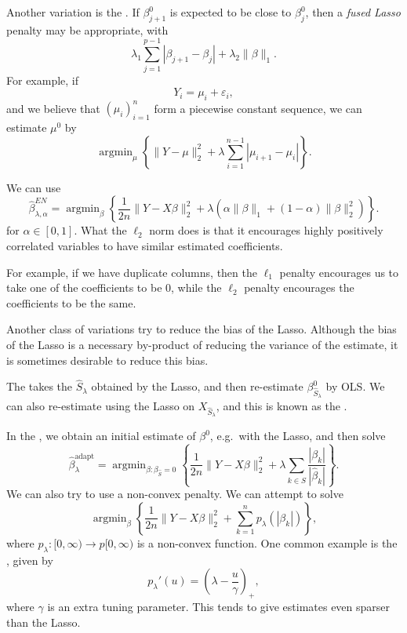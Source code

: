 \documentclass[a4paper]{article}
\DeclareMathOperator*\argmin{argmin}
\begin{document}
\begin{eg}
  Another variation is the . If $\beta^0_{j + 1}$ is expected to be close to $\beta_j^0$, then a \emph{fused Lasso} penalty may be appropriate, with
  \[
    \lambda_1 \sum_{j = 1}^{p - 1} |\beta_{j + 1} - \beta_j| + \lambda_2 \|\beta\|_1.
  \]
  For example, if
  \[
    Y_i = \mu_i + \varepsilon_i,
  \]
  and we believe that $(\mu_i)_{i = 1}^n$ form a piecewise constant sequence, we can estimate $\mu^0$ by
  \[
    \argmin_\mu \left\{\|Y - \mu\|_2^2 + \lambda \sum_{i = 1}^{n - 1} |\mu_{i + 1} - \mu_i|\right\}.
  \]
\end{eg}

\begin{eg}
  We can use
  \[
    \hat{\beta}_{\lambda, \alpha}^{EN} = \argmin_{\beta} \left\{\frac{1}{2n} \|Y - X \beta\|_2^2 + \lambda (\alpha \|\beta\|_1 + (1 - \alpha)\|\beta\|_2^2)\right\}.
  \]
  for $\alpha \in [0, 1]$. What the $\ell_2$ norm does is that it encourages highly positively correlated variables to have similar estimated coefficients.

  For example, if we have duplicate columns, then the $\ell_1$ penalty encourages us to take one of the coefficients to be $0$, while the $\ell_2$ penalty encourages the coefficients to be the same.
\end{eg}

Another class of variations try to reduce the bias of the Lasso. Although the bias of the Lasso is a necessary by-product of reducing the variance of the estimate, it is sometimes desirable to reduce this bias.

The  takes the $\hat{S}_\lambda$ obtained by the Lasso, and then re-estimate $\beta^0_{\hat{S}_\lambda}$ by OLS. We can also re-estimate using the Lasso on $X_{\hat{S}_\lambda}$, and this is known as the .

In the , we obtain an initial estimate of $\beta^0$, e.g.\ with the Lasso, and then solve
\[
  \hat{\beta}^{\mathrm{adapt}}_\lambda = \argmin_{\beta : \beta_{\hat{S}} = 0} \left\{\frac{1}{2n} \|Y - X \beta\|_2^2 + \lambda \sum_{k \in \hat{S}} \frac{|\beta_k|}{|\hat{\beta}_k|}\right\}.
\]
We can also try to use a non-convex penalty. We can attempt to solve
\[
  \argmin_\beta \left\{\frac{1}{2n} \|Y - X \beta\|_2^2 + \sum_{k = 1}^n p_\lambda(|\beta_k|)\right\},
\]
where $p_\lambda: [0, \infty) \to p[0, \infty)$ is a non-convex function. One common example is the , given by
\[
  p_\lambda'(u) = \left(\lambda - \frac{u}{\gamma}\right)_+,
\]
where $\gamma$ is an extra tuning parameter. This tends to give estimates even sparser than the Lasso.
\end{document}
